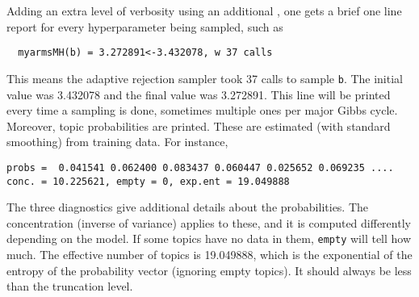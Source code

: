 \documentclass[a4paper,english]{article}
\begin{document}
Adding an extra level of verbosity using an additional , one gets
a brief one line report for every hyperparameter being sampled,
such as
\begin{verbatim}
  myarmsMH(b) = 3.272891<-3.432078, w 37 calls 
\end{verbatim}
This means the adaptive rejection sampler took 37 calls
to sample \texttt{b}.  The initial value was 3.432078
and the final value was 3.272891.
This line will be printed every time a sampling is done, sometimes multiple
ones per major Gibbs cycle.
Moreover, topic probabilities are printed.
These are estimated (with standard smoothing) from
training data.  For instance,
\begin{verbatim}
probs =  0.041541 0.062400 0.083437 0.060447 0.025652 0.069235 ....
conc. = 10.225621, empty = 0, exp.ent = 19.049888
\end{verbatim}
The three diagnostics give additional details about the probabilities.
The concentration (inverse of variance) applies to these,
and it is computed differently depending on the model.
If some topics have no data in them, \texttt{empty} will tell how much.
The effective number of topics is 19.049888,
which is the exponential of the entropy of the probability vector
(ignoring empty topics).
It should always be less than the truncation level.
\end{document}

